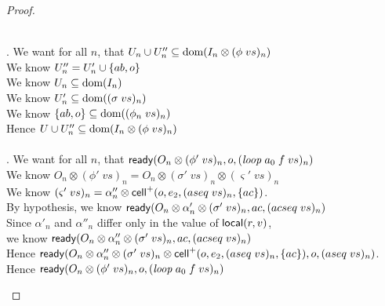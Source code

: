 \begin{proof}
\begin{enumerate}
\begin{tabbedproof}
  \\ . We want for all $n$, that $U_n \cup U''_n \subseteq \mbox{dom}({I_n \otimes (\phi\;vs)_n})$ \\
  \ooo We know $U''_n = U'_n \cup \{{ab,o}\}$ \\
  \ooo We know $U_n \subseteq \mbox{dom}({I_n})$ \\
  \ooo We know $U'_n \subseteq \mbox{dom}({(\sigma\;vs)_n})$ \\
  \ooo We know $\{{ab,o}\} \subseteq \mbox{dom}({(\phi_n\;vs)_n})$ \\
  \ooo Hence $U \cup U''_n \subseteq \mbox{dom}({I_n \otimes (\phi\;vs)_n})$ \\

  \\ . We want for all $n$, that $\mathsf{ready}({O_n \otimes (\phi'\;vs)_n}, {o}, {(\mathit{loop}\;a_0\;f\;vs)_n})$ \\

  \ooo We know $O_n \otimes (\phi'\;vs)_n = O_n \otimes (\sigma'\;vs)_n \otimes (\varsigma'\;vs)_n$ \\
  \ooo We know $(\varsigma'\;vs)_n = \alpha''_n \otimes \mathsf{cell}^{+}({o}, {e_2}, {(aseq\;vs)_n}, {\{{ac}\}})$. \\
  \ooo By hypothesis, we know $\mathsf{ready}({O_n \otimes \alpha'_n \otimes (\sigma'\;vs)_n}, {ac}, {(acseq\;vs)_n})$ \\
  \ooo Since $\alpha'_n$ and $\alpha''_n$ differ only in the value of $\mathsf{local}({r}, {v})$,  \\
  \ooo we know $\mathsf{ready}({O_n \otimes \alpha''_n \otimes (\sigma'\;vs)_n}, {ac}, {(acseq\;vs)_n})$ \\
  \ooo Hence $\mathsf{ready}({O_n \otimes \alpha''_n \otimes (\sigma'\;vs)_n \otimes \mathsf{cell}^{+}({o}, {e_2}, {(aseq\;vs)_n}, {\{{ac}\}})}, {o}, {(aseq\;vs)_n})$. \\
  \ooo Hence $\mathsf{ready}({O_n \otimes (\phi'\;vs)_n}, {o}, {(\mathit{loop}\;a_0\;f\;vs)_n})$ \\


\end{tabbedproof}
\end{enumerate}
\end{proof}
